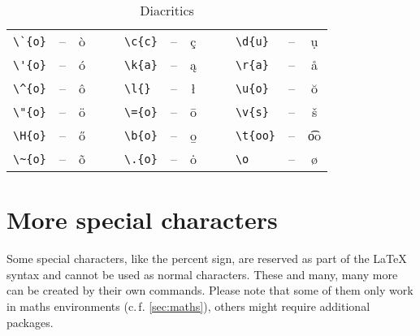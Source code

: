 \begin{table}[H]
	\center
	\begin{tabular}{lccclccclcc}
		\toprule
			\verb|\`{o}| & -- & \`{o} & $\quad$ & \verb|\c{c}| & -- & \c{c} & $\quad$ & \verb|\d{u}| & -- & \d{u} \\
			\verb|\'{o}| & -- & \'{o} & & \verb|\k{a}| & -- & \k{a} & & \verb|\r{a}| & -- & \r{a} \\
			\verb|\^{o}| & -- & \^{o} & & \verb|\l{}| & -- & \l{} & & \verb|\u{o}| & -- & \u{o} \\
			\verb|\"{o}| & -- & \"{o} & & \verb|\={o}| & -- & \={o} & & \verb|\v{s}| & -- & \v{s} \\
			\verb|\H{o}| & -- & \H{o} & & \verb|\b{o}| & -- & \b{o} & & \verb|\t{oo}| & -- & \t{oo} \\
			\verb|\~{o}| & -- & \~{o} & & \verb|\.{o}| & -- & \.{o} & & \verb|\o| & -- & \o \\
		\bottomrule
	\end{tabular}
	\caption{Diacritics}
	\label{tbl:diacritics}
\end{table}

\section{More special characters}\label{sec:more-special-characters}
Some special characters, like the percent sign, are reserved as part of the \LaTeX{} syntax and cannot be used as normal characters.
These and many, many more can be created by their own commands.
Please note that some of them only work in maths environments (c.\,f. \cref{sec:maths}), others might require additional packages.

